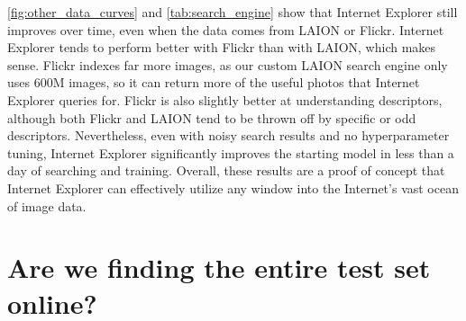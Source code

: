 \cref{fig:other_data_curves} and \cref{tab:search_engine} show that Internet Explorer still improves over time, even when the data comes from LAION or Flickr. 
Internet Explorer tends to perform better with Flickr than with LAION, which makes sense. Flickr indexes far more images, as our custom LAION search engine only uses 600M images, so it can return more of the useful photos that Internet Explorer queries for. Flickr is also slightly better at understanding descriptors, although both Flickr and LAION tend to be thrown off by specific or odd descriptors. Nevertheless, even with noisy search results and no hyperparameter tuning, Internet Explorer significantly improves the starting model in less than a day of searching and training. Overall, these results are a proof of concept that Internet Explorer can effectively utilize any window into the Internet's vast ocean of image data. 


\section{Are we finding the entire test set online?}
\label{sec:finding_test_set_online}

